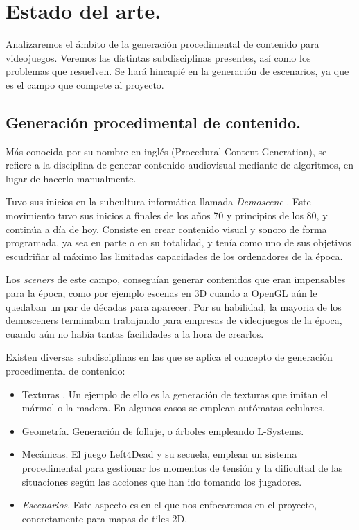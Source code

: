 \chapter{Estado del arte.}\label{cap:capitulo1}

Analizaremos el ámbito de la generación procedimental de contenido para videojuegos. Veremos las distintas subdisciplinas presentes, así como los problemas que resuelven. Se hará hincapié en la generación de escenarios, ya que es el campo que compete al proyecto.

\section{Generación procedimental de contenido.}

Más conocida por su nombre en inglés (Procedural Content Generation), se refiere a la disciplina de generar contenido audiovisual mediante de algoritmos, en lugar de hacerlo manualmente.

Tuvo sus inicios en la subcultura informática llamada \emph{Demoscene} \cite{dmscn}. Este movimiento tuvo sus inicios a finales de los años 70 y principios de los 80, y continúa a día de hoy. Consiste en crear contenido visual y sonoro de forma programada, ya sea en parte o en su totalidad, y tenía como uno de sus objetivos escudriñar al máximo las limitadas capacidades de los ordenadores de la época.

Los \emph{sceners} de este campo, conseguían generar contenidos que eran impensables para la época, como por ejemplo escenas en 3D cuando a OpenGL aún le quedaban un par de décadas para aparecer. Por su habilidad, la mayoria de los demosceners terminaban trabajando para empresas de videojuegos de la época, cuando aún no había tantas facilidades a la hora de crearlos.

Existen diversas subdisciplinas en las que se aplica el concepto de generación procedimental de contenido:

\begin{itemize}
	\item Texturas \cite{texmodproc}. Un ejemplo de ello es la generación de texturas que imitan el mármol o la madera. En algunos casos se emplean autómatas celulares.
	\item Geometría. Generación de follaje, o árboles empleando L-Systems. \cite{texmodproc}
	\item Mecánicas. El juego Left4Dead y su secuela, emplean un sistema procedimental para gestionar los momentos de tensión y la dificultad de las situaciones según las acciones que han ido tomando los jugadores.
	\item \emph{Escenarios}. Este aspecto es en el que nos enfocaremos en el proyecto, concretamente para mapas de tiles 2D.
\end{itemize}

